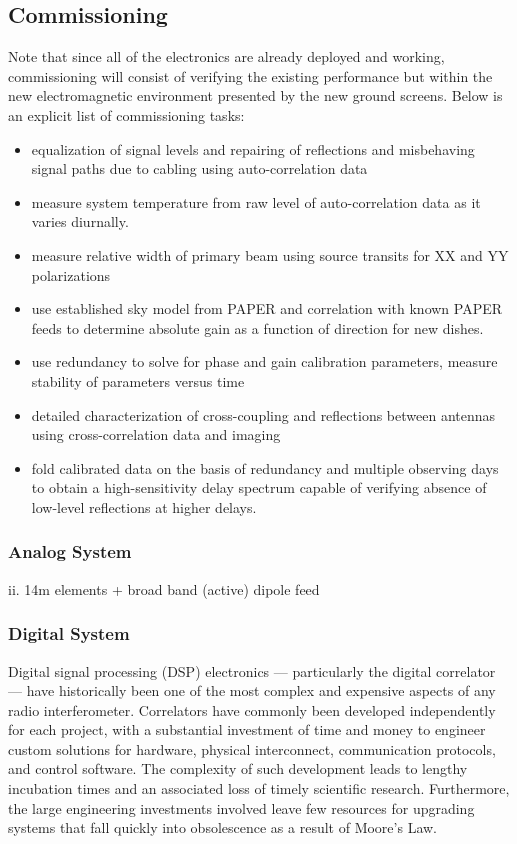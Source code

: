 \documentclass[preprint]{aastex}
\begin{document}
\vspace{-0.25in}
\subsection{Commissioning}
\vspace{-6pt}
Note that since all of the electronics are already deployed and working, commissioning will consist of verifying the existing performance but within the new electromagnetic environment presented by the new ground screens.  Below is
an explicit list of commissioning tasks:
\begin{itemize}[noitemsep,nolistsep]
\item equalization of signal levels and repairing of reflections and misbehaving signal paths due to cabling using auto-correlation data 
\item measure system temperature from raw level of auto-correlation data as it varies diurnally.
\item measure relative width of primary beam using source transits for XX and YY polarizations 
\item use established sky model from PAPER and correlation with known PAPER feeds to 
determine absolute gain as a function of direction for new dishes. 
\item use redundancy to solve for phase and gain calibration parameters, measure stability of parameters versus 
time 
\item detailed characterization of cross-coupling and reflections between antennas using cross-correlation data and imaging 
\item fold calibrated data on the basis of redundancy and multiple observing days to obtain a high-sensitivity delay spectrum capable of verifying absence of low-level reflections at higher delays. 
\end{itemize}

\subsubsection{Analog System}
ii. 14m elements + broad band (active) dipole feed

\subsubsection{Digital System}

Digital signal processing (DSP) electronics --- particularly the digital correlator ---
have historically been one of the most complex and expensive aspects of any radio interferometer.
Correlators have commonly been
developed independently for each project, with a substantial investment
of time and money to engineer
custom solutions for hardware, physical interconnect,
communication protocols, and control software. The complexity of such development
leads to lengthy incubation times and an
associated loss of timely scientific research. Furthermore, the large
engineering investments involved leave few resources
for upgrading systems that fall quickly into obsolescence as a result
of Moore's Law.
\end{document}
